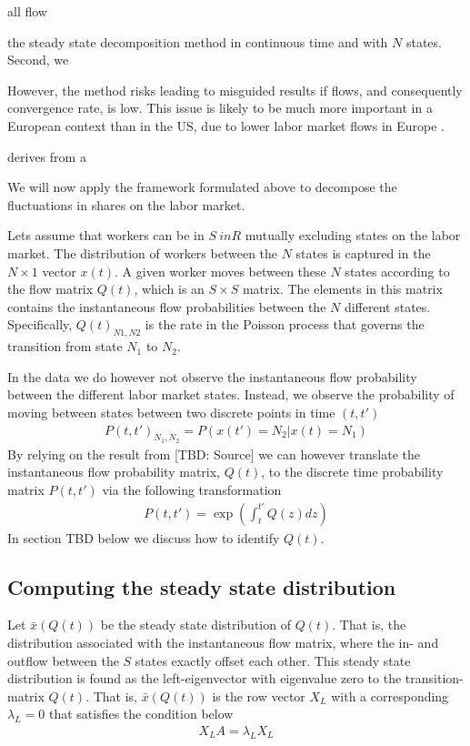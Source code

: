 



all flow

the steady state decomposition method in continuous time and with $N$ states. Second, we 


 However, the method risks leading to misguided results if flows, and consequently convergence rate, is low. This issue is likely to be much more important in a European context than in the US, due to lower labor market flows in Europe \cite{Elsby2013}. 

derives from \cite{Shimer2012} a

We will now apply the framework formulated above to decompose the fluctuations in shares on the labor market. 

Lets assume that workers can be in $S \ in R$ mutually excluding states on the labor market. The distribution of workers between the $N$ states is captured in the $N \times 1$ vector $x(t)$. A given worker moves between these $N$ states according to the flow matrix $Q(t)$, which is an $S \times S$ matrix. The elements in this matrix contains the instantaneous flow probabilities between the $N$ different states. Specifically, $Q(t)_{N1, N2}$ is the rate in the Poisson process that governs the transition from state $N_1$ to $N_2$. %

In the data we do however not observe the instantaneous flow probability between the different labor market states. Instead, we observe the probability of moving between states between two discrete points in time $(t,t')$ 
\begin{align}
P(t,t')_{N_1, N_2}=P\left( x(t')=N_2 | x(t)=N_1 \right)
\end{align}
By relying on the result from [TBD: Source] we can however translate the instantaneous flow probability matrix, $Q(t)$, to the discrete time probability matrix $P(t,t')$ via the following transformation
\begin{align}
P(t,t')=\exp \left( \int_{t}^{t'} Q(z) dz \right)
\end{align}
In section TBD below we discuss how to identify $Q(t)$.

\subsection{Computing the steady state distribution}

Let $\bar{x}(Q(t))$ be the steady state distribution of $Q(t)$. That is, the distribution associated with the instantaneous flow matrix, where the in- and outflow between the $S$ states exactly offset each other. This steady state distribution is found as the left-eigenvector with eigenvalue zero to the transition-matrix $Q(t)$. That is, $\bar{x}(Q(t))$ is the row vector $X_L$ with a corresponding $\lambda_L=0$ that satisfies the condition below
\begin{align}
X_L A=\lambda_L X_L \label{eq:left_eigen}
\end{align}

